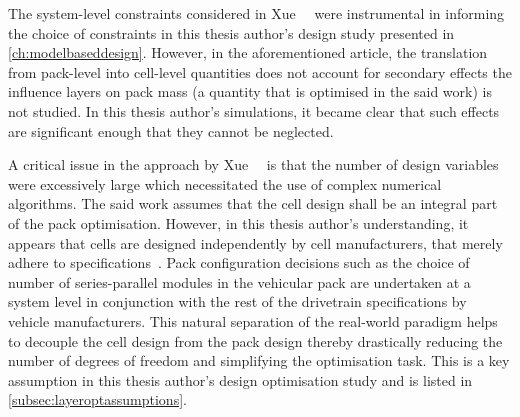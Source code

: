 The  system-level  constraints   considered  in  Xue~\etal~\cite{Xue2013a}  were
instrumental   in  informing   the  choice   of  constraints   in  this   thesis
author's  design  study  presented in  \cref{ch:modelbaseddesign}.  However,  in
the  aforementioned article,  the  translation from  pack-level into  cell-level
quantities does not account for secondary  effects \ie{} the influence layers on
pack mass  (a quantity that is  optimised in the  said work) is not  studied. In
this  thesis  author's  simulations,  it  became clear  that  such  effects  are
significant enough that they cannot be neglected.

A critical issue in the approach by Xue~\etal~\cite{Xue2013a} is that the number
of design variables were excessively large which necessitated the use of complex
numerical algorithms.  The said work  assumes that the  cell design shall  be an
integral  part  of the  pack  optimisation.  However,  in this  thesis  author's
understanding,  it  appears  that  cells  are  designed  independently  by  cell
manufacturers, that merely  adhere to specifications~\cite{Maksimovic2012}. Pack
configuration decisions such as the  choice of number of series-parallel modules
in  the vehicular  pack are  undertaken at  a system  level in  conjunction with
the  rest  of  the  drivetrain specifications  by  vehicle  manufacturers.  This
natural  separation  of the  real-world  paradigm  helps  to decouple  the  cell
design  from  the  pack  design  thereby  drastically  reducing  the  number  of
degrees  of  freedom and  simplifying  the  optimisation  task.  This is  a  key
assumption in  this thesis author's design  optimisation study and is  listed in
\cref{subsec:layeroptassumptions}.



